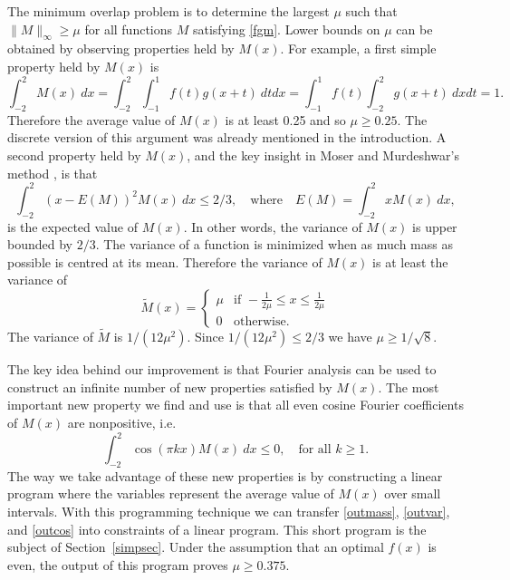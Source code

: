 \documentclass[12pt]{article}
\numberwithin{equation}{section}
\begin{document}
The minimum overlap problem is to determine the largest $\mu$ such that $\| M \|_\infty \geq\mu$ for all functions $M$ satisfying \eqref{fgm}. Lower bounds on $\mu$ can be obtained by observing properties held by $M(x)$. For example, a first simple property held by $M(x)$ is 
\begin{equation}\label{outmass} \int_{-2}^2 M(x) \ dx =   \int_{-2}^2  \int_{-1}^1 f(t) g(x+t) \ dtdx =  \int_{-1}^1 f(t)  \int_{-2}^2 g(x+t) \ dx dt =1.  \end{equation}
Therefore the average value of $M(x)$ is at least 0.25 and so $\mu \geq 0.25$. The discrete version of this argument was already mentioned in the introduction. A second property held by $M(x)$, and the key insight in Moser and Murdeshwar's method \cite{M}, \cite{M2} is that
\begin{equation}\label{outvar} \int_{-2}^2 (x-E(M))^2 M(x) \ dx \leq 2/3, \quad  \text{where} \quad E(M) = \int_{-2}^2 x M(x) \ dx, \end{equation}
is the expected value of $M(x)$. In other words, the variance of $M(x)$ is upper bounded by $2/3$. The variance of a function is minimized when as much mass as possible is centred at its mean. Therefore the variance of $M(x)$ is at least the variance of
\[ \tilde{M}(x) = \begin{cases} \mu & \text{if } -\frac{1}{2\mu} \leq x \leq \frac{1}{2\mu} \\ 0 & \text{otherwise.} \end{cases}\]
The variance of $\tilde{M}$ is $1/(12\mu^2)$. Since $1/(12\mu^2) \leq 2/3$ we have $\mu \geq 1/\sqrt{8}$. 

The key idea behind our improvement is that Fourier analysis can be used to construct an infinite number of new properties satisfied by $M(x)$. The most important new property we find and use is that all even cosine Fourier coefficients of $M(x)$ are nonpositive, i.e. 
\begin{equation}\label{outcos} \int_{-2}^2 \cos(\pi k x) M(x) \ dx \leq 0 , \quad \text{for all } k \geq 1.\end{equation}
The way we take advantage of these new properties is by constructing a linear program where the variables represent the average value of $M(x)$ over small intervals. With this programming technique we can transfer \eqref{outmass}, \eqref{outvar}, and \eqref{outcos} into constraints of a linear program. This short program is the subject of Section~\ref{simpsec}. Under the assumption that an optimal $f(x)$ is even, the output of this program proves $\mu \geq 0.375$. 
\end{document}
